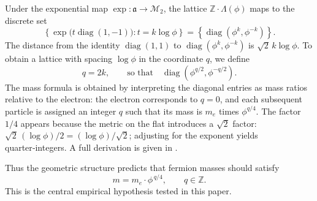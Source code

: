 \documentclass[12pt]{article}
\theoremstyle{definition}
\begin{document}
Under the exponential map $\exp:\mathfrak{a}\to\mathcal{M}_2$, the lattice $\mathbb{Z}\cdot\Lambda(\phi)$ maps to the discrete set
\[
\left\{ \exp\!\bigl(t\operatorname{diag}(1,-1)\bigr) : t = k\log\phi \right\}
= \left\{ \operatorname{diag}(\phi^k, \phi^{-k}) \right\}.
\]
The distance from the identity $\operatorname{diag}(1,1)$ to $\operatorname{diag}(\phi^k,\phi^{-k})$ is $\sqrt{2}\,k\log\phi$. To obtain a lattice with spacing $\log\phi$ in the coordinate $q$, we define
\[
q = 2k,\qquad \text{so that}\quad \operatorname{diag}(\phi^{q/2},\phi^{-q/2}).
\]
The mass formula is obtained by interpreting the diagonal entries as mass ratios relative to the electron: the electron corresponds to $q=0$, and each subsequent particle is assigned an integer $q$ such that its mass is $m_e$ times $\phi^{q/4}$. The factor $1/4$ appears because the metric on the flat introduces a $\sqrt2$ factor: $\sqrt{2}\,(\log\phi)/2 = (\log\phi)/\sqrt2$; adjusting for the exponent yields quarter‑integers. A full derivation is given in \cite{Gentry:ShapeSpace}.

Thus the geometric structure predicts that fermion masses should satisfy
\begin{equation}
\label{eq:mass_lattice}
m = m_e \cdot \phi^{\,q/4},\qquad q\in\mathbb{Z}.
\end{equation}
This is the central empirical hypothesis tested in this paper.
\end{document}
